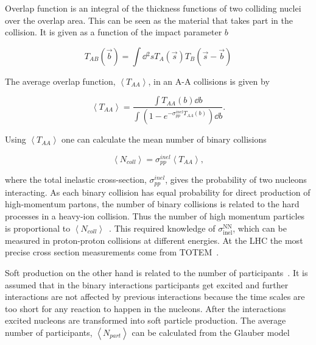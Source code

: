 Overlap function is an integral of the thickness functions of two colliding nuclei over the overlap area. This can be seen as the material that takes part in the collision. It is given as a function of the impact parameter $b$

\begin{equation}
T_{AB}\left(\vec b\right)=\int \dd{^2s} T_A\left(\vec s\right) T_B\left(\vec s - \vec b\right)
\end{equation}

\noindent The average overlap function, $\left<T_{AA}\right>$, in an A-A collisions  is given by~\cite{Afanasiev:2009aa}

\begin{equation}
\left<T_{AA}\right>=\frac{\int T_{AA}\left(b\right) \dd b}
{\int\left(1-e^{-\sigma^{inel}_{pp}T_{AA}\left(b\right)}\right)\dd b}.
\end{equation}

\noindent Using $\left<T_{AA}\right>$ one can calculate the mean number of binary collisions

\begin{equation}
\left<N_{coll}\right>=\sigma_{pp}^{inel}\left<T_{AA}\right>,
\end{equation}

\noindent where the total inelastic cross-section, $\sigma_{pp}^{inel}$, gives the probability of two nucleons interacting. As each binary collision has equal probability for direct production of high-momentum partons, the number of binary collisions is related to the hard processes in a heavy-ion collision. Thus the number of high momentum particles is proportional to $\left<N_{coll}\right>$~\cite{Abelev:2013qoq,Kharzeev:2004if,Deng:2010mv}. This required knowledge of $\sigma\mathrm{^{NN}_{inel}}$, which can be measured in proton-proton collisions at different energies. At the LHC the most precise cross section measurements come from TOTEM~\cite{Antchev:2017dia}.

Soft production on the other hand is related to the number of participants~\cite{Kharzeev:2004if}. It is assumed that in the binary interactions participants get excited and further interactions are not affected by previous interactions because the time scales are too short for any reaction to happen in the nucleons. After the interactions excited nucleons are transformed into soft particle production. The average number of participants, $\left<N_{part}\right>$ can be calculated from the Glauber model 


